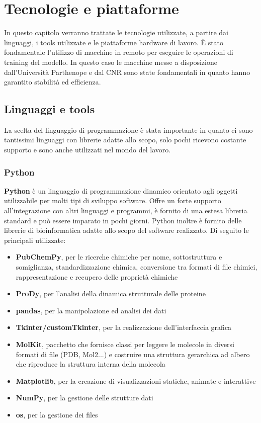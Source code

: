 \chapter{Tecnologie e piattaforme}
In questo capitolo verranno trattate le tecnologie utilizzate, a partire dai linguaggi, i tools utilizzate e le piattaforme hardware di lavoro. È stato fondamentale l’utilizzo di macchine in remoto per eseguire le operazioni di training del modello. In questo caso le macchine messe a disposizione dall’Università Parthenope e dal CNR sono state fondamentali in quanto hanno garantito stabilità ed efficienza.

\section{Linguaggi e tools}
La scelta del linguaggio di programmazione è stata importante in quanto ci sono tantissimi linguaggi con librerie adatte allo scopo, solo pochi ricevono costante supporto e sono anche utilizzati nel mondo del lavoro.

\subsection{Python}
\textbf{Python} è un linguaggio di programmazione dinamico orientato agli oggetti utilizzabile per molti tipi  di sviluppo software. Offre un forte supporto all'integrazione con altri linguaggi e programmi, è fornito di una estesa libreria standard e può essere imparato in pochi giorni. Python inoltre è fornito delle librerie di bioinformatica adatte allo scopo del software realizzato. Di seguito le principali utilizzate:

\begin{itemize}
    \item \textbf{PubChemPy}, per le ricerche chimiche per nome, sottostruttura e somiglianza, standardizzazione chimica, conversione tra formati di file chimici, rappresentazione e recupero delle proprietà chimiche
    \item \textbf{ProDy}, per l'analisi della dinamica strutturale delle proteine
    \item \textbf{pandas}, per la manipolazione ed analisi dei dati
    \item \textbf{Tkinter/customTkinter}, per la realizzazione dell'interfaccia grafica
    \item \textbf{MolKit}, pacchetto che fornisce classi per leggere le molecole in diversi formati di file (PDB, Mol2...) e costruire una struttura gerarchica ad albero che riproduce la struttura interna della molecola
    \item \textbf{Matplotlib}, per la creazione di visualizzazioni statiche, animate e interattive
    \item \textbf{NumPy}, per la gestione delle strutture dati
    \item \textbf{os}, per la gestione dei files
\end{itemize} 

